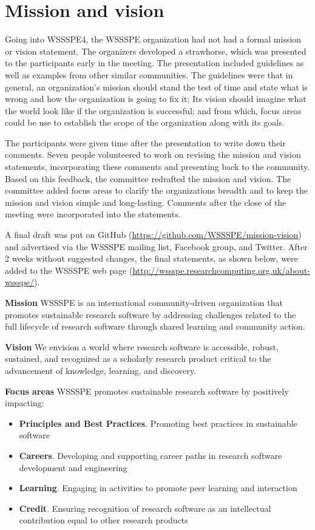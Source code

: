 \documentclass[11pt, oneside]{amsart}
\newcommand{\note}[1]{ {\textcolor{blueish}    { ***Note:      #1 }}}
\begin{document}
\section{Mission and vision}\label{sec:mission}


Going into WSSSPE4, the WSSSPE organization had not had a formal mission or vision statement.
The organizers developed a strawhorse, which was presented to the participants early in the meeting.
The presentation included guidelines as well as examples from other similar communities.
The guidelines were that in general, an organization's mission should stand the test of time and state what is wrong and how the organization is going to fix it; Its vision should imagine what the world look like if the organization is successful; and from which, focus areas could be use to establish the scope of the organization along with its goals.

The participants were given time after the presentation to write down their comments.
Seven people volunteered to work on revising the mission and vision statements, incorporating these comments and presenting back to the community.
Based on this feedback, the committee redrafted the mission and vision.
The committee added focus areas to clarify the organizations breadth and to keep the mission and vision simple and long-lasting.
Comments after the close of the meeting were incorporated into the statements.

A final draft was put on GitHub (\url{https://github.com/WSSSPE/mission-vision}) and advertised
via the WSSSPE mailing list, Facebook group, and Twitter.
After 2 weeks without suggested changes, the final statements, as shown below, were added
to the WSSSPE web page (\url{http://wssspe.researchcomputing.org.uk/about-wssspe/}).

{\bf Mission}
WSSSPE is an international community-driven organization that promotes sustainable research software by addressing challenges related to the full lifecycle of research software through shared learning and community action.

{\bf Vision}
We envision a world where research software is accessible, robust, sustained, and recognized as a scholarly research product critical to the advancement of knowledge, learning, and discovery.

{\bf Focus areas}
WSSSPE promotes sustainable research software by positively impacting:
\begin{itemize}
\item {\bf Principles and Best Practices}. Promoting best practices in sustainable software
\item {\bf Careers}. Developing and supporting career paths in research software development and engineering
\item {\bf Learning}. Engaging in activities to promote peer learning and interaction
\item {\bf Credit}. Ensuring recognition of research software as an intellectual contribution equal to other research products
\end{itemize}
\end{document}
